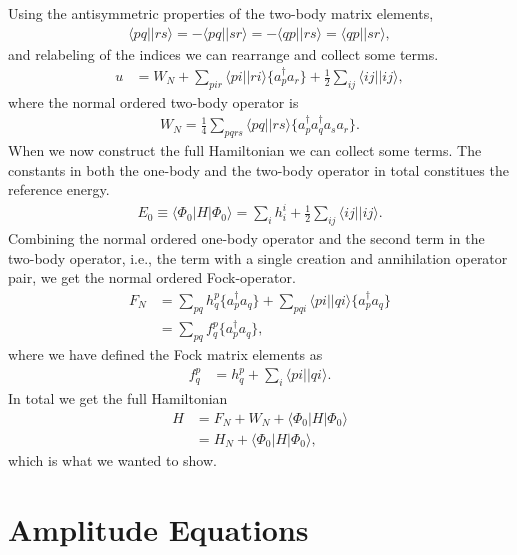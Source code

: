 \documentclass[
    a4paper, aps, twocolumn, floatfix, superscriptaddress,
    nofootinbib]{revtex4-1}
\newcommand{\1}{\mathds{1}}
\newcommand{\half}{\frac{1}{2}}
\newcommand{\bra}[1]{\langle #1\lvert}
\newcommand{\ket}[1]{\rvert #1\rangle}
\newcommand{\acr}[1]{a_{#1}^{\dagger}}
\newcommand{\ade}[1]{a_{#1}}
\newcommand{\kslat}{\ket{\Phi_0}}
\newcommand{\bslat}{\bra{\Phi_0}}
\begin{document}
    Using the antisymmetric properties of the two-body matrix elements,
    \begin{align}
        \bra{pq}\ket{rs}
        = - \bra{pq}\ket{sr}
        = - \bra{qp}\ket{rs}
        = \bra{qp}\ket{sr},
    \end{align}
    and relabeling of the indices we can rearrange and collect some terms.
    \begin{align}
        u
        &=
        W_N + \sum_{pir}\bra{pi}\ket{ri}\{\acr{p}\ade{r}\}
        + \half\sum_{ij}\bra{ij}\ket{ij},
    \end{align}
    where the normal ordered two-body operator is
    \begin{align}
        W_N = \frac{1}{4}\sum_{pqrs}
        \bra{pq}\ket{rs}\{\acr{p}\acr{q}\ade{s}\ade{r}\}.
    \end{align}
    When we now construct the full Hamiltonian we can collect some terms. The
    constants in both the one-body and the two-body operator in total constitues
    the reference energy.
    \begin{align}
        E_0 \equiv \bslat H\kslat
        = \sum_{i}h_i^i + \frac{1}{2}\sum_{ij}\bra{ij}\ket{ij}.
        \label{eq:reference_energy}
    \end{align}
    Combining the normal ordered one-body operator and the second term in the
    two-body operator, i.e., the term with a single creation and annihilation
    operator pair, we get the normal ordered Fock-operator.
    \begin{align}
        F_N
        &=
        \sum_{pq}h_{q}^{p}\{\acr{p}\ade{q}\}
        + \sum_{pqi}\bra{pi}\ket{qi}\{\acr{p}\ade{q}\}
        \\
        &= \sum_{pq}f_{q}^{p}\{\acr{p}\ade{q}\},
    \end{align}
    where we have defined the Fock matrix elements as
    \begin{align}
        f_{q}^{p}
        &=
        h_q^p + \sum_{i}\bra{pi}\ket{qi}.
    \end{align}
    In total we get the full Hamiltonian
    \begin{align}
        H
        &=
        F_N + W_N + \bslat H\kslat
        \\
        &= H_N + \bslat H\kslat,
    \end{align}
    which is what we wanted to show.\cite{crawford2007introduction}

\section{Amplitude Equations}
\end{document}

